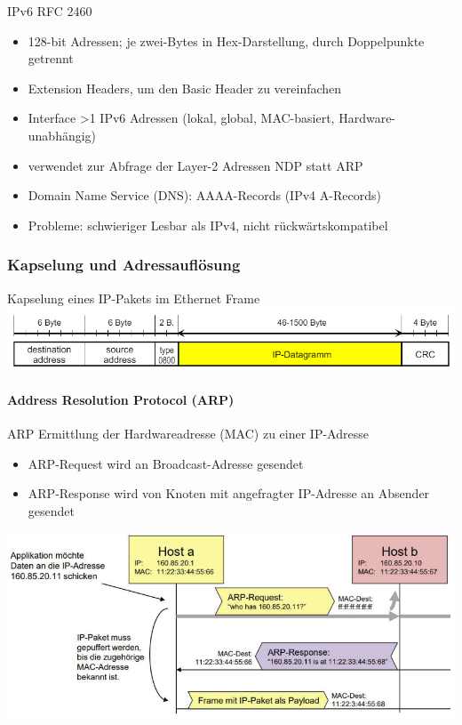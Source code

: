 \begin{definition}{IPv6} RFC 2460
    \begin{itemize}
        \item 128-bit Adressen; je zwei-Bytes in Hex-Darstellung, durch Doppelpunkte getrennt
        \item Extension Headers, um den Basic Header zu vereinfachen
        \item Interface >1 IPv6 Adressen (lokal, global, MAC-basiert, Hardware-unabhängig)
        \item verwendet zur Abfrage der Layer-2 Adressen NDP statt ARP
        \item Domain Name Service (DNS): AAAA-Records (IPv4 A-Records)
        \item Probleme: schwieriger Lesbar als IPv4, nicht rückwärtskompatibel
    \end{itemize}
\end{definition}

\columnbreak

\subsubsection{Kapselung und Adressauflösung}

\begin{definition}{Kapselung eines IP-Pakets im Ethernet Frame}\\
        \includegraphics[width=1\linewidth]{images/kapselung_ip_paket.png}
\end{definition}



\paragraph*{Address Resolution Protocol (ARP)}

\begin{concept}{ARP}
    Ermittlung der Hardwareadresse (MAC) zu einer IP-Adresse
    \begin{itemize}
        \item ARP-Request wird an Broadcast-Adresse gesendet
        \item ARP-Response wird von Knoten mit angefragter IP-Adresse an Absender gesendet
    \end{itemize}
        \includegraphics[width=1\linewidth]{images/arp_concept.png}
\end{concept}

